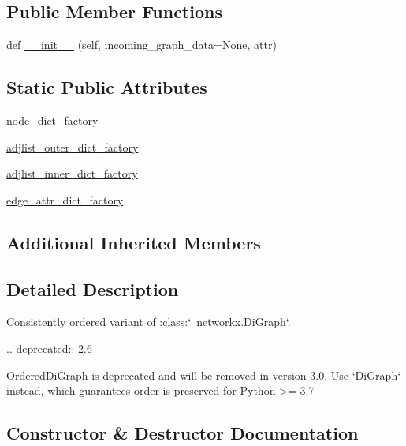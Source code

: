 \subsection*{Public Member Functions}
\begin{DoxyCompactItemize}
\item 
def \hyperlink{classnetworkx_1_1classes_1_1ordered_1_1OrderedDiGraph_a3b19b6b4d14defb8f8496b455aeb0731}{\+\_\+\+\_\+init\+\_\+\+\_\+} (self, incoming\+\_\+graph\+\_\+data=None, attr)
\end{DoxyCompactItemize}
\subsection*{Static Public Attributes}
\begin{DoxyCompactItemize}
\item 
\hyperlink{classnetworkx_1_1classes_1_1ordered_1_1OrderedDiGraph_a4e177b351217cf53fca947e846a75754}{node\+\_\+dict\+\_\+factory}
\item 
\hyperlink{classnetworkx_1_1classes_1_1ordered_1_1OrderedDiGraph_af0eeae27f1ae70e2a014f263273233d8}{adjlist\+\_\+outer\+\_\+dict\+\_\+factory}
\item 
\hyperlink{classnetworkx_1_1classes_1_1ordered_1_1OrderedDiGraph_aca5caa46d70ea527b5326145a3fb235d}{adjlist\+\_\+inner\+\_\+dict\+\_\+factory}
\item 
\hyperlink{classnetworkx_1_1classes_1_1ordered_1_1OrderedDiGraph_a403ebce2610b7687bc016cc2fa9278ed}{edge\+\_\+attr\+\_\+dict\+\_\+factory}
\end{DoxyCompactItemize}
\subsection*{Additional Inherited Members}


\subsection{Detailed Description}
\begin{DoxyVerb}Consistently ordered variant of :class:`~networkx.DiGraph`.

.. deprecated:: 2.6

   OrderedDiGraph is deprecated and will be removed in version 3.0.
   Use `DiGraph` instead, which guarantees order is preserved for
   Python >= 3.7
\end{DoxyVerb}
 

\subsection{Constructor \& Destructor Documentation}
\mbox{\label{classnetworkx_1_1classes_1_1ordered_1_1OrderedDiGraph_a3b19b6b4d14defb8f8496b455aeb0731}} 
